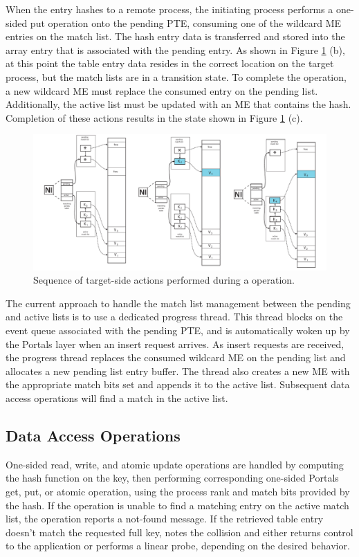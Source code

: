When the entry hashes to a remote process, the initiating process
performs a one-sided put operation onto the pending PTE, consuming one
of the wildcard ME entries on the match list. The hash entry data is
transferred and stored into the array entry that is associated with
the pending entry. As shown in Figure \ref{fig:put} (b), at this point
the table entry data resides in the correct location on the target
process, but the match lists are in a transition state.  To complete the
operation, a new wildcard ME must replace the consumed entry on the
pending list. Additionally, the active list must be updated with an ME
that contains the hash. Completion of these actions results in the state shown
in Figure \ref{fig:put} (c).

\begin{figure}
  \centering
  \includegraphics[width=\linewidth]{figs/put}
  \caption{Sequence of target-side actions performed during a  operation.}
  \label{fig:put}
\end{figure}

The current approach to handle the match list management between the
pending and active lists is to use a dedicated progress thread. This
thread blocks on the event queue associated with the pending PTE,
and is automatically woken up by the Portals layer when an insert request
arrives. As insert requests are received, the
progress thread replaces the consumed wildcard ME on the pending list and allocates a
new pending list entry buffer. The thread also creates a new
ME with the appropriate match bits set and appends it to the active
list. Subsequent data access operations will find a match in the active list.

\subsection{Data Access Operations}

One-sided read, write, and atomic update operations are handled by computing
the hash function on the key, then performing corresponding one-sided Portals
get, put, or atomic operation, using the process rank and
match bits provided by the hash. If the operation is unable to
find a matching entry on the active match list, the operation reports
a not-found message. If the retrieved table entry doesn't match the
requested full key, \pdht notes the collision and either returns
control to the application or performs a linear probe, depending on
the desired behavior.

